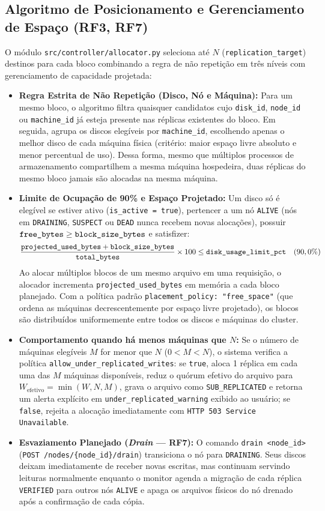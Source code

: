 \documentclass[10pt,a4paper]{article}
\begin{document}
\subsection{Algoritmo de Posicionamento e Gerenciamento de Espaço (RF3, RF7)}
O módulo \texttt{src/controller/allocator.py} seleciona até $N$ (\texttt{replication\_target}) destinos para cada bloco combinando a regra de não repetição em três níveis com gerenciamento de capacidade projetada:
\begin{itemize}
    \item \textbf{Regra Estrita de Não Repetição (Disco, Nó e Máquina):} Para um mesmo bloco, o algoritmo filtra quaisquer candidatos cujo \texttt{disk\_id}, \texttt{node\_id} ou \texttt{machine\_id} já esteja presente nas réplicas existentes do bloco. Em seguida, agrupa os discos elegíveis por \texttt{machine\_id}, escolhendo apenas o melhor disco de cada máquina física (critério: maior espaço livre absoluto e menor percentual de uso). Dessa forma, mesmo que múltiplos processos de armazenamento compartilhem a mesma máquina hospedeira, duas réplicas do mesmo bloco jamais são alocadas na mesma máquina.
    \item \textbf{Limite de Ocupação de 90\% e Espaço Projetado:} Um disco só é elegível se estiver ativo (\texttt{is\_active = true}), pertencer a um nó \texttt{ALIVE} (nós em \texttt{DRAINING}, \texttt{SUSPECT} ou \texttt{DEAD} nunca recebem novas alocações), possuir $\text{\texttt{free\_bytes}} \ge \text{\texttt{block\_size\_bytes}}$ e satisfizer:
    \[
        \frac{\text{\texttt{projected\_used\_bytes}} + \text{\texttt{block\_size\_bytes}}}{\text{\texttt{total\_bytes}}} \times 100 \le \text{\texttt{disk\_usage\_limit\_pct}} \quad (90,0\%)
    \]
    Ao alocar múltiplos blocos de um mesmo arquivo em uma requisição, o alocador incrementa \texttt{projected\_used\_bytes} em memória a cada bloco planejado. Com a política padrão \texttt{placement\_policy: "free\_space"} (que ordena as máquinas decrescentemente por espaço livre projetado), os blocos são distribuídos uniformemente entre todos os discos e máquinas do cluster.
    \item \textbf{Comportamento quando há menos máquinas que $N$:} Se o número de máquinas elegíveis $M$ for menor que $N$ ($0 < M < N$), o sistema verifica a política \texttt{allow\_under\_replicated\_writes}: se \texttt{true}, aloca 1 réplica em cada uma das $M$ máquinas disponíveis, reduz o quórum efetivo do arquivo para $W_{\text{efetivo}} = \min(W, N, M)$, grava o arquivo como \texttt{SUB\_REPLICATED} e retorna um alerta explícito em \texttt{under\_replicated\_warning} exibido ao usuário; se \texttt{false}, rejeita a alocação imediatamente com \texttt{HTTP 503 Service Unavailable}.
    \item \textbf{Esvaziamento Planejado (\textit{Drain} — RF7):} O comando \texttt{drain <node\_id>} (\texttt{POST /nodes/\{node\_id\}/drain}) transiciona o nó para \texttt{DRAINING}. Seus discos deixam imediatamente de receber novas escritas, mas continuam servindo leituras normalmente enquanto o monitor agenda a migração de cada réplica \texttt{VERIFIED} para outros nós \texttt{ALIVE} e apaga os arquivos físicos do nó drenado após a confirmação de cada cópia.
\end{itemize}
\end{document}
